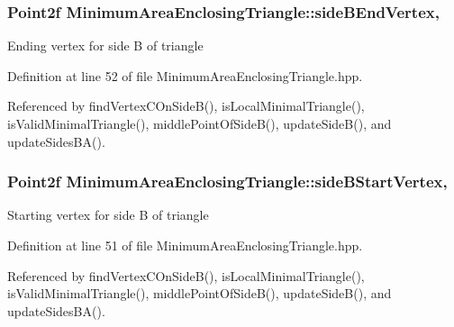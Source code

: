 \hypertarget{classmultiscale_1_1MinimumAreaEnclosingTriangle_a4183750a67cc95d70695820376a52453}{
\subsubsection[{side\-B\-End\-Vertex}]{\setlength{\rightskip}{0pt plus 5cm}Point2f Minimum\-Area\-Enclosing\-Triangle\-::side\-B\-End\-Vertex\hspace{0.3cm}{\ttfamily [static]}, {\ttfamily [private]}}}\label{classmultiscale_1_1MinimumAreaEnclosingTriangle_a4183750a67cc95d70695820376a52453}
Ending vertex for side B of triangle 

Definition at line 52 of file Minimum\-Area\-Enclosing\-Triangle.\-hpp.



Referenced by find\-Vertex\-C\-On\-Side\-B(), is\-Local\-Minimal\-Triangle(), is\-Valid\-Minimal\-Triangle(), middle\-Point\-Of\-Side\-B(), update\-Side\-B(), and update\-Sides\-B\-A().

\hypertarget{classmultiscale_1_1MinimumAreaEnclosingTriangle_a01c5a1d51bf85edcd3b9498192b5c70e}{
\subsubsection[{side\-B\-Start\-Vertex}]{\setlength{\rightskip}{0pt plus 5cm}Point2f Minimum\-Area\-Enclosing\-Triangle\-::side\-B\-Start\-Vertex\hspace{0.3cm}{\ttfamily [static]}, {\ttfamily [private]}}}\label{classmultiscale_1_1MinimumAreaEnclosingTriangle_a01c5a1d51bf85edcd3b9498192b5c70e}
Starting vertex for side B of triangle 

Definition at line 51 of file Minimum\-Area\-Enclosing\-Triangle.\-hpp.



Referenced by find\-Vertex\-C\-On\-Side\-B(), is\-Local\-Minimal\-Triangle(), is\-Valid\-Minimal\-Triangle(), middle\-Point\-Of\-Side\-B(), update\-Side\-B(), and update\-Sides\-B\-A().

